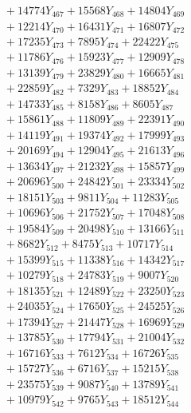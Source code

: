 \documentclass[a4paper,10pt]{article}
\begin{document}
{\begin{align}
&\;  + 14774 Y_{467} + 15568 Y_{468} + 14804 Y_{469} \\[0.3ex]
&\;  + 12214 Y_{470} + 16431 Y_{471} + 16807 Y_{472} \\[0.3ex]
&\;  + 17235 Y_{473} + 7895 Y_{474} + 22422 Y_{475} \\[0.3ex]
&\;  + 11786 Y_{476} + 15923 Y_{477} + 12909 Y_{478} \\[0.5ex]\allowbreak
&\;  + 13139 Y_{479} + 23829 Y_{480} + 16665 Y_{481} \\[0.3ex]
&\;  + 22859 Y_{482} + 7329 Y_{483} + 18852 Y_{484} \\[0.3ex]
&\;  + 14733 Y_{485} + 8158 Y_{486} + 8605 Y_{487} \\[0.3ex]
&\;  + 15861 Y_{488} + 11809 Y_{489} + 22391 Y_{490} \\[0.3ex]
&\;  + 14119 Y_{491} + 19374 Y_{492} + 17999 Y_{493} \\[0.3ex]
&\;  + 20169 Y_{494} + 12904 Y_{495} + 21613 Y_{496} \\[0.3ex]
&\;  + 13634 Y_{497} + 21232 Y_{498} + 15857 Y_{499} \\[0.3ex]
&\;  + 20696 Y_{500} + 24842 Y_{501} + 23334 Y_{502} \\[0.3ex]
&\;  + 18151 Y_{503} + 9811 Y_{504} + 11283 Y_{505} \\[0.3ex]
&\;  + 10696 Y_{506} + 21752 Y_{507} + 17048 Y_{508} \\[0.5ex]\allowbreak
&\;  + 19584 Y_{509} + 20498 Y_{510} + 13166 Y_{511} \\[0.3ex]
&\;  + 8682 Y_{512} + 8475 Y_{513} + 10717 Y_{514} \\[0.3ex]
&\;  + 15399 Y_{515} + 11338 Y_{516} + 14342 Y_{517} \\[0.3ex]
&\;  + 10279 Y_{518} + 24783 Y_{519} + 9007 Y_{520} \\[0.3ex]
&\;  + 18135 Y_{521} + 12489 Y_{522} + 23250 Y_{523} \\[0.3ex]
&\;  + 24035 Y_{524} + 17650 Y_{525} + 24525 Y_{526} \\[0.3ex]
&\;  + 17394 Y_{527} + 21447 Y_{528} + 16969 Y_{529} \\[0.3ex]
&\;  + 13785 Y_{530} + 17794 Y_{531} + 21004 Y_{532} \\[0.3ex]
&\;  + 16716 Y_{533} + 7612 Y_{534} + 16726 Y_{535} \\[0.3ex]
&\;  + 15727 Y_{536} + 6716 Y_{537} + 15215 Y_{538} \\[0.5ex]\allowbreak
&\;  + 23575 Y_{539} + 9087 Y_{540} + 13789 Y_{541} \\[0.3ex]
&\;  + 10979 Y_{542} + 9765 Y_{543} + 18512 Y_{544} \\[0.3ex]

\end{align}}
\end{document}

